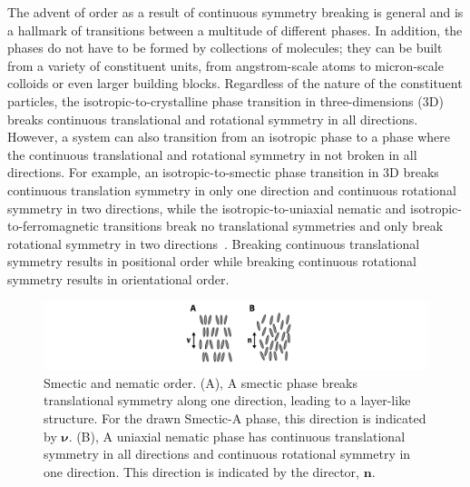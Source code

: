 The advent of order as a result of continuous symmetry breaking is general and is a hallmark of transitions between a multitude of different phases.
In addition, the phases do not have to be formed by collections of molecules; they can be built from a variety of constituent units, from angstrom-scale atoms to micron-scale colloids or even larger building blocks.
Regardless of the nature of the constituent particles, the isotropic-to-crystalline phase transition in three-dimensions (3D) breaks continuous translational and rotational symmetry in all directions.
However, a system can also transition from an isotropic phase to a phase where the continuous translational and rotational symmetry in not broken in all directions.
For example, an isotropic-to-smectic phase transition in 3D breaks continuous translation symmetry in only one direction and continuous rotational symmetry in two directions, while the isotropic-to-uniaxial nematic and isotropic-to-ferromagnetic transitions break no translational symmetries and only break rotational symmetry in two directions~\cite{RN175}.
Breaking continuous translational symmetry results in positional order while breaking continuous rotational symmetry results in orientational order.
\begin{figure}
  \includegraphics{figures/C1/Ch1-Figs_SmecticNematic.png}
  \caption{Smectic and nematic order.
  (A), A smectic phase breaks translational symmetry along one direction, leading to a layer-like structure.
  For the drawn Smectic-A phase, this direction is indicated by $\bm{\nu}$.
  (B), A uniaxial nematic phase has continuous translational symmetry in all directions and continuous rotational symmetry in one direction. This direction is indicated by the director, $\mathbf{n}$.}\label{f:1-SmecticNematic}
\end{figure}

